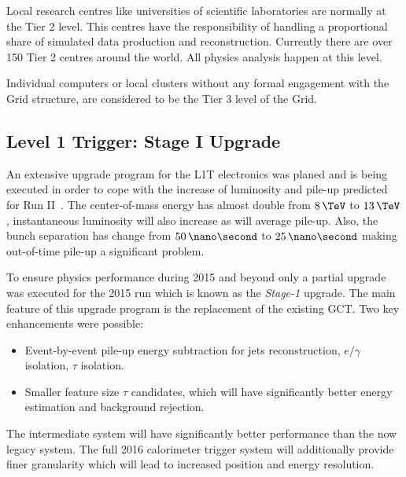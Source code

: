 Local research centres like universities of scientific laboratories are normally at the Tier 2 level. This centres have the responsibility of handling a proportional share of simulated data production and reconstruction. Currently there are over 150 Tier 2 centres around the world. All physics analysis happen at this level.

Individual computers or local clusters without any formal engagement with the Grid structure, are considered to be the Tier 3 level of the Grid. 

\subsection{Level 1 Trigger: Stage I Upgrade}
\label{SUBSECTION:ExperimentalApparatus_CMS_L1TStage1}


An extensive upgrade program for the \gls{L1T} electronics was planed and is being executed in order to cope with the increase of luminosity and pile-up predicted for Run II~\cite{CMSTDR:CMSL1Upgrade,CMSTDR:CMSUpgradeTDR}. The center-of-mass energy has almost double from $8\,\TeV$ to $13\,\TeV$, instantaneous luminosity will also increase as will average pile-up. Also, the bunch separation has change from $50\,\nano\second$ to $25\,\nano\second$ making out-of-time pile-up a significant problem. 

To ensure physics performance during 2015 and beyond only a partial upgrade was executed for the 2015 run which is known as the \textit{Stage-1} upgrade. The main feature of this upgrade program is the replacement of the existing \gls{GCT}. Two key enhancements were possible: 

\begin{itemize}
  \item Event-by-event pile-up energy subtraction for jets reconstruction, $e/\gamma$ isolation, $\tau$ isolation.
  \item Smaller feature size $\tau$ candidates, which will have significantly better energy estimation and background rejection.
\end{itemize}

The intermediate system will have significantly better performance than the now legacy system. The full 2016 calorimeter trigger system will additionally provide finer granularity which will lead to increased position and energy resolution. 
